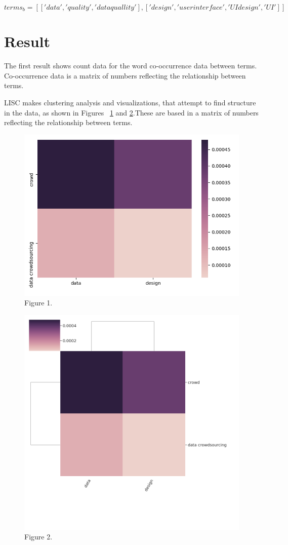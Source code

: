 \documentclass{article}
\begin{document}
\begin{equation}
terms_b = [['data','quality', 'data quallity'],['design','user interface','UI design','UI']]
\end{equation}
\section{Result}
 The first result shows count data for the word co-occurrence data between terms.
Co-occurrence data is a matrix of numbers reflecting the relationship between terms. 



LISC makes clustering analysis and visualizations,  that attempt to find structure in the data, as shown in Figures ~\ref{fig:matrix}  and   \ref{fig:2}.These are based in a matrix of numbers reflecting the relationship between terms.


\begin{figure}[!h]
  \centering
  \includegraphics[width=300 pt]{output1.png}
  \caption{Figure 1.}
  \label{fig:matrix}
\end{figure}


\begin{figure}
 \centering
  \includegraphics[width=300 pt]{output2.png}
  \caption{Figure 2.}
  \label{fig:2}
\end{figure}
\end{document}

